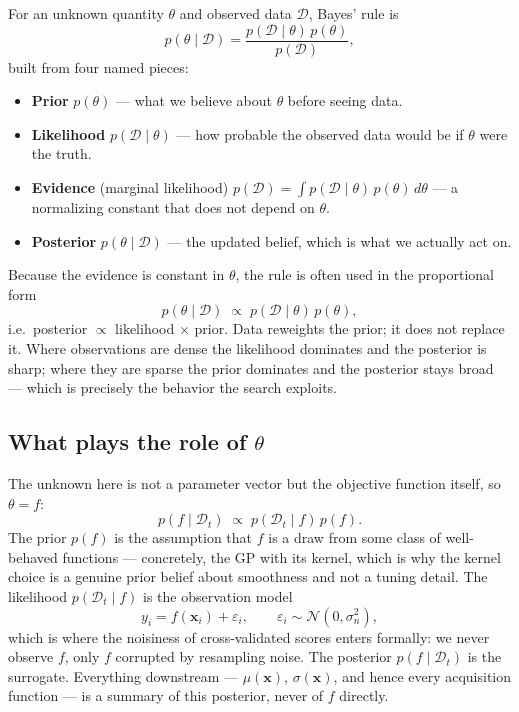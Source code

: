 \documentclass[conference]{IEEEtran}
\begin{document}
For an unknown quantity $\theta$ and observed data $\mathcal{D}$, Bayes' rule is
\begin{equation}
    p(\theta \mid \mathcal{D}) = \frac{p(\mathcal{D} \mid \theta)\, p(\theta)}{p(\mathcal{D})},
\end{equation}
built from four named pieces:
\begin{itemize}
    \item \textbf{Prior} $p(\theta)$ --- what we believe about $\theta$ before seeing data.
    \item \textbf{Likelihood} $p(\mathcal{D} \mid \theta)$ --- how probable the observed data would be if $\theta$ were the truth.
    \item \textbf{Evidence} (marginal likelihood) $p(\mathcal{D}) = \int p(\mathcal{D} \mid \theta)\, p(\theta)\, d\theta$ --- a normalizing constant that does not depend on $\theta$.
    \item \textbf{Posterior} $p(\theta \mid \mathcal{D})$ --- the updated belief, which is what we actually act on.
\end{itemize}
Because the evidence is constant in $\theta$, the rule is often used in the proportional form
\begin{equation}
    p(\theta \mid \mathcal{D}) \;\propto\; p(\mathcal{D} \mid \theta)\, p(\theta),
\end{equation}
i.e.\ posterior $\propto$ likelihood $\times$ prior. Data reweights the prior; it does not replace it. Where observations are dense the likelihood dominates and the posterior is sharp; where they are sparse the prior dominates and the posterior stays broad --- which is precisely the behavior the search exploits.

\subsection*{What plays the role of $\theta$}
The unknown here is not a parameter vector but the objective function itself, so $\theta = f$:
\begin{equation}
    p(f \mid \mathcal{D}_t) \;\propto\; p(\mathcal{D}_t \mid f)\, p(f).
\end{equation}
The prior $p(f)$ is the assumption that $f$ is a draw from some class of well-behaved functions --- concretely, the GP with its kernel, which is why the kernel choice is a genuine prior belief about smoothness and not a tuning detail. The likelihood $p(\mathcal{D}_t \mid f)$ is the observation model
\begin{equation}
    y_i = f(\mathbf{x}_i) + \varepsilon_i, \qquad \varepsilon_i \sim \mathcal{N}(0, \sigma_n^2),
\end{equation}
which is where the noisiness of cross-validated scores enters formally: we never observe $f$, only $f$ corrupted by resampling noise. The posterior $p(f \mid \mathcal{D}_t)$ is the surrogate. Everything downstream --- $\mu(\mathbf{x})$, $\sigma(\mathbf{x})$, and hence every acquisition function --- is a summary of this posterior, never of $f$ directly.
\end{document}
